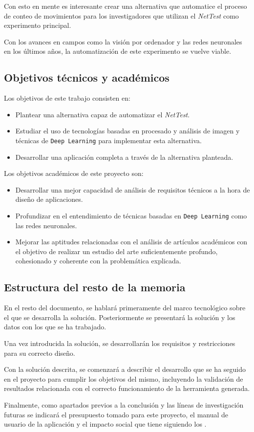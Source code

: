 Con esto en mente es interesante crear una alternativa que automatice el proceso de conteo de movimientos para los investigadores que utilizan el \textit{NetTest} como experimento principal. 

Con los avances en campos como la visión por ordenador y las redes neuronales en los últimos años, la automatización de este experimento se vuelve viable.

\vspace{2\baselineskip}

\subsection{Objetivos técnicos y académicos}
Los objetivos de este trabajo consisten en:

\begin{itemize}
    \item Plantear una alternativa capaz de automatizar el \textit{NetTest}.
    \item Estudiar el uso de tecnologías basadas en procesado y análisis de imagen y técnicas de \texttt{Deep Learning} para implementar esta alternativa.
    \item Desarrollar una aplicación completa a través de la alternativa planteada.
\end{itemize}

Los objetivos académicos de este proyecto son:

\begin{itemize}
    \item Desarrollar una mejor capacidad de análisis de requisitos técnicos a la hora de diseño de aplicaciones.
    \item Profundizar en el entendimiento de técnicas basadas en \texttt{Deep Learning} como las redes neuronales.
    \item Mejorar las aptitudes relacionadas con el análisis de artículos académicos con el objetivo de realizar un estudio del arte suficientemente profundo, cohesionado y coherente con la problemática explicada.
\end{itemize}

\clearpage
\subsection{Estructura del resto de la memoria}

En el resto del documento, se hablará primeramente del marco tecnológico sobre el que se desarrolla la solución. Posteriormente se presentará la solución y los datos con los que se ha trabajado.

Una vez introducida la solución, se desarrollarán los requisitos y restricciones para su correcto diseño.

Con la solución descrita, se comenzará a describir el desarrollo que se ha seguido en el proyecto para cumplir los objetivos del mismo, incluyendo la validación de resultados relacionada con el 
correcto funcionamiento de la herramienta generada.

Finalmente, como apartados previos a la conclusión y las líneas de investigación futuras se indicará el presupuesto tomado para este proyecto, el manual de usuario de la aplicación y el impacto social 
que tiene siguiendo los .